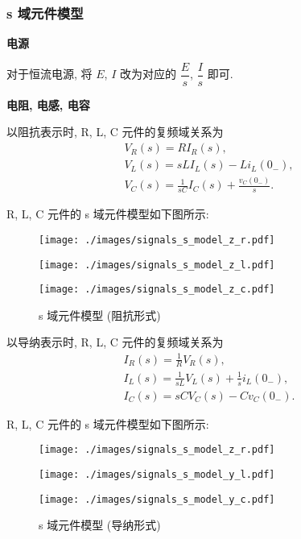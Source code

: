 \subsubsection{s 域元件模型}
\textbf{电源}

对于恒流电源, 将 $E$, $I$ 改为对应的 $\dfrac{E}{s}$, $\dfrac{I}{s}$ 即可.

\textbf{电阻, 电感, 电容}

以阻抗表示时, R, L, C 元件的复频域关系为
\begin{gather*}
    V_R(s)=RI_R(s), \\
    V_L(s)=sLI_L(s)-Li_L(0_-), \\
    V_C(s)=\frac{1}{sC}I_C(s)+\frac{v_C(0_-)}{s}.
\end{gather*}

R, L, C 元件的 s 域元件模型如下图所示:
\begin{figure}[H]
    \centering
    \begin{minipage}{.32\textwidth}
        \centering
        \texttt{[image: ./images/signals\_s\_model\_z\_r.pdf]}
    \end{minipage}
    \begin{minipage}{.32\textwidth}
        \centering
        \texttt{[image: ./images/signals\_s\_model\_z\_l.pdf]}
    \end{minipage}
    \begin{minipage}{.32\textwidth}
        \centering
        \texttt{[image: ./images/signals\_s\_model\_z\_c.pdf]}
    \end{minipage}
    \caption{s 域元件模型 (阻抗形式)}
\end{figure}

以导纳表示时, R, L, C 元件的复频域关系为
\begin{gather*}
    I_R(s)=\frac{1}{R}V_R(s), \\
    I_L(s)=\frac{1}{sL}V_L(s)+\frac{1}{s}i_L(0_-), \\
    I_C(s)=sCV_C(s)-Cv_C(0_-).
\end{gather*}

R, L, C 元件的 s 域元件模型如下图所示:
\begin{figure}[H]
    \centering
    \begin{minipage}{.32\textwidth}
        \centering
        \texttt{[image: ./images/signals\_s\_model\_z\_r.pdf]}
    \end{minipage}
    \begin{minipage}{.32\textwidth}
        \centering
        \texttt{[image: ./images/signals\_s\_model\_y\_l.pdf]}
    \end{minipage}
    \begin{minipage}{.32\textwidth}
        \centering
        \texttt{[image: ./images/signals\_s\_model\_y\_c.pdf]}
    \end{minipage}
    \caption{s 域元件模型 (导纳形式)}
\end{figure}

